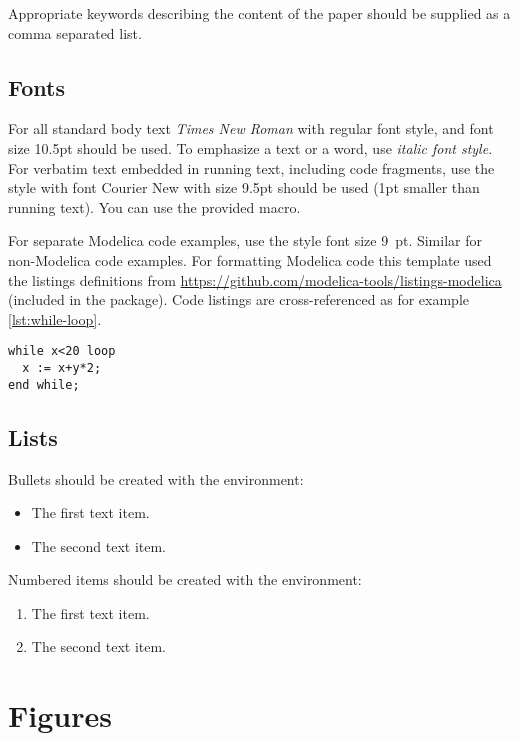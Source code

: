 \documentclass{modelica}
\begin{document}
Appropriate keywords describing the content of the paper should be
supplied as a comma separated list.

\subsection{Fonts}

For all standard body text \emph{Times New Roman} with regular font style, and font size 10.5pt should be used. To emphasize a text or a word, use \emph{italic font style}. For verbatim text embedded in running text, including code fragments, use the style {} with font Courier New with size 9.5pt should be used (1pt smaller than running text). You can use the provided  macro.

For separate Modelica code examples, use the style font size 9~pt.
Similar for non-Modelica code examples.
For formatting Modelica code this template used the listings definitions from {\small\url{https://github.com/modelica-tools/listings-modelica}} (included in the package).
Code listings are cross-referenced as for example \autoref{lst:while-loop}.

\begin{lstlisting}[caption=A while loop,label=lst:while-loop]
while x<20 loop
  x := x+y*2;
end while;
\end{lstlisting}

\subsection{Lists}

Bullets should be created with the  environment:
\begin{itemize}
\item The first text item.
\item The second text item.
\end{itemize}
Numbered items should be created with the  environment:
\begin{enumerate}
\item The first text item.
\item The second text item.
\end{enumerate}

\section{Figures}
\end{document}

